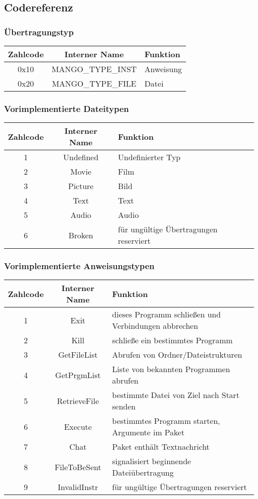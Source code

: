 \subsection*{Codereferenz}
\label{enums}
\subsubsection*{Übertragungstyp}
\begin{tabular}{|c|c|l|}
\hline
Zahlcode & Interner Name & Funktion\\
\hline
0x10 & MANGO\_TYPE\_INST & Anweisung\\
\hline
0x20 & MANGO\_TYPE\_FILE & Datei\\
\hline
\end{tabular}

\subsubsection*{Vorimplementierte Dateitypen}
\begin{tabular}{|c|c|l|}
\hline
Zahlcode & Interner Name & Funktion\\\hline
1 & Undefined & Undefinierter Typ\\\hline
2 & Movie & Film\\\hline
3 & Picture & Bild\\\hline
4 & Text & Text\\\hline
5 & Audio & Audio\\\hline
6 & Broken & für ungültige Übertragungen reserviert\\\hline
\end{tabular}

\subsubsection*{Vorimplementierte Anweisungstypen}
\begin{tabular}{|c|c|l|}
\hline
Zahlcode & Interner Name & Funktion\\\hline
1&    Exit           & dieses Programm schließen und Verbindungen abbrechen\\\hline
2&    Kill           & schließe ein bestimmtes Programm\\\hline
3&    GetFileList    & Abrufen von Ordner/Dateistrukturen\\\hline
4&    GetPrgmList    & Liste von bekannten Programmen abrufen\\\hline
5&    RetrieveFile   & bestimmte Datei von Ziel nach Start senden\\\hline
6&    Execute        & bestimmtes Programm starten, Argumente im Paket\\\hline
7&    Chat           & Paket enthält Textnachricht\\\hline
8&    FileToBeSent   & signalisiert beginnende Dateiübertragung\\\hline
9&    InvalidInstr   & für ungültige Übertragungen reserviert\\\hline
\end{tabular}

